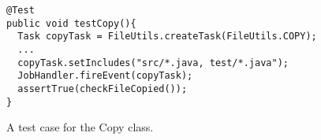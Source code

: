 \begin{figure}[!th]
 \centering
 \begin{lstlisting}[style=MyJavaSmallStyle]
@Test
public void testCopy(){
  Task copyTask = FileUtils.createTask(FileUtils.COPY);
  ...
  copyTask.setIncludes("src/*.java, test/*.java");
  JobHandler.fireEvent(copyTask);
  assertTrue(checkFileCopied());
}
\end{lstlisting}
\vspace{-3mm}
\caption{A test case for the {\ttt Copy} class.}%
\label{fig:test}
\vspace{-6mm}
\end{figure}
